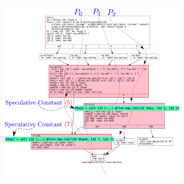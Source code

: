 \documentclass[aspectratio=169, compress]{beamer}
\begin{document}
\begin{frame}
	\centering
	\includegraphics[width=10cm, height=9.5cm]{dotfiles/specSCCP_HPSSA_next.dot.pdf}
\end{frame}
\end{document}
